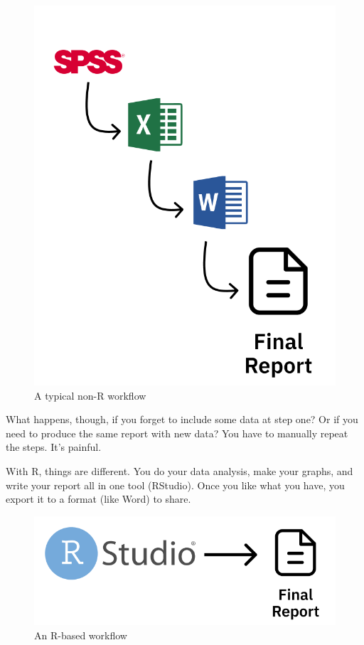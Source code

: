 \documentclass[
]{book}
\begin{document}
\begin{figure}
\includegraphics[width=1\linewidth]{assets/non-r-workflow} \caption{A typical non-R workflow}\label{fig:unnamed-chunk-8}
\end{figure}

What happens, though, if you forget to include some data at step one? Or if you need to produce the same report with new data? You have to manually repeat the steps. It's painful.

With R, things are different. You do your data analysis, make your graphs, and write your report all in one tool (RStudio). Once you like what you have, you export it to a format (like Word) to share.

\begin{figure}
\includegraphics[width=1\linewidth]{assets/r-workflow} \caption{An R-based workflow}\label{fig:unnamed-chunk-9}
\end{figure}
\end{document}
